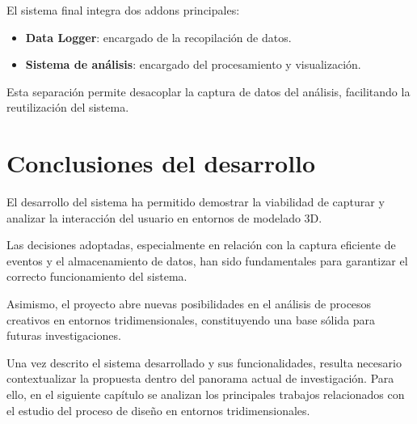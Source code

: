 El sistema final integra dos addons principales:

\begin{itemize}
    \item \textbf{Data Logger}: encargado de la recopilación de datos.
    \item \textbf{Sistema de análisis}: encargado del procesamiento y visualización.
\end{itemize}

Esta separación permite desacoplar la captura de datos del análisis, facilitando la reutilización del sistema.

\section{Conclusiones del desarrollo}

El desarrollo del sistema ha permitido demostrar la viabilidad de capturar y analizar la interacción del usuario en entornos de modelado 3D.

Las decisiones adoptadas, especialmente en relación con la captura eficiente de eventos y el almacenamiento de datos, han sido fundamentales para garantizar el correcto funcionamiento del sistema.

Asimismo, el proyecto abre nuevas posibilidades en el análisis de procesos creativos en entornos tridimensionales, constituyendo una base sólida para futuras investigaciones.

Una vez descrito el sistema desarrollado y sus funcionalidades, resulta necesario contextualizar la propuesta dentro del panorama actual de investigación. Para ello, en el siguiente capítulo se analizan los principales trabajos relacionados con el estudio del proceso de diseño en entornos tridimensionales.

